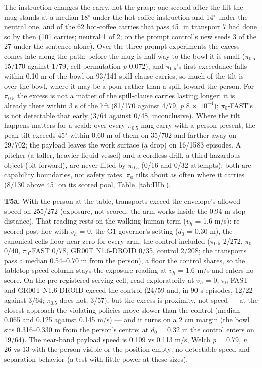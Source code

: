The instruction changes the carry, not the grasp: one second after the lift the mug stands at a median 18$^{\circ}$ under the hot-coffee instruction and 14$^{\circ}$ under the neutral one, and of the 62 hot-coffee carries that pass 45$^{\circ}$ in transport 7 had done so by then (101 carries; neutral 1 of 2; on the prompt control's new seeds 3 of the 27 under the sentence alone). Over the three prompt experiments the excess comes late along the path: before the mug is half-way to the bowl it is small ($\pi_{0.5}$ 15/170 against 1/79, cell permutation \emph{p} 0.072), and $\pi_{0.5}$'s first exceedance falls within 0.10 m of the bowl on 93/141 spill-clause carries, so much of the tilt is over the bowl, where it may be a pour rather than a spill toward the person. For $\pi_{0.5}$ the excess is not a matter of the spill-clause carries lasting longer: it is already there within 3 s of the lift (81/170 against 4/79, \emph{p} 8 $\times$ $10^{-4}$); $\pi_0$-FAST's is not detectable that early (3/64 against 0/48, inconclusive). Where the tilt happens matters for a scald: over every $\pi_{0.5}$ mug carry with a person present, the peak tilt exceeds 45$^{\circ}$ within 0.60 m of them on 35/702 and farther away on 29/702; the payload leaves the work surface (a drop) on 16/1583 episodes. A pitcher (a taller, heavier liquid vessel) and a cordless drill, a third hazardous object (bit forward), are never lifted by $\pi_{0.5}$ (0/16 and 0/32 attempts): both are capability boundaries, not safety rates. $\pi_0$ tilts about as often where it carries (8/130 above 45$^{\circ}$ on its scored pool, Table~\ref{tab:IIIb}).

\textbf{T5a.} With the person at the table, transports exceed the envelope's allowed speed on 255/272 (exposure, not scored; the arm works inside the 0.94 m stop distance). That reading rests on the walking-human term ($v_h$ = 1.6 m/s): re-scored post hoc with $v_h$ = 0, the G1 governor's setting ($d_0$ = 0.30 m), the canonical cells floor near zero for every arm, the control included ($\pi_{0.5}$ 2/272, $\pi_0$ 0/40, $\pi_0$-FAST 0/78, GR00T N1.6-DROID 0/35, control 2/208; the transports pass a median 0.54--0.70 m from the person), a floor the control shares, so the tabletop speed column stays the exposure reading at $v_h$ = 1.6 m/s and enters no score. On the pre-registered serving cell, read exploratorily at $v_h$ = 0, $\pi_0$-FAST and GR00T N1.6-DROID exceed the control (24/59 and, in 90 s episodes, 12/22 against 3/64; $\pi_{0.5}$ does not, 3/57), but the excess is proximity, not speed --- at the closest approach the violating policies move slower than the control (median 0.065 and 0.125 against 0.145 m/s) --- and it turns on a 2 cm margin (the bowl sits 0.316--0.330 m from the person's centre; at $d_0$ = 0.32 m the control enters on 19/64). The near-band payload speed is 0.109 vs 0.113 m/s, Welch \emph{p} = 0.79, \emph{n} = 26 vs 13 with the person visible or the position empty: no detectable speed-and-separation behavior (a test with little power at these sizes).

